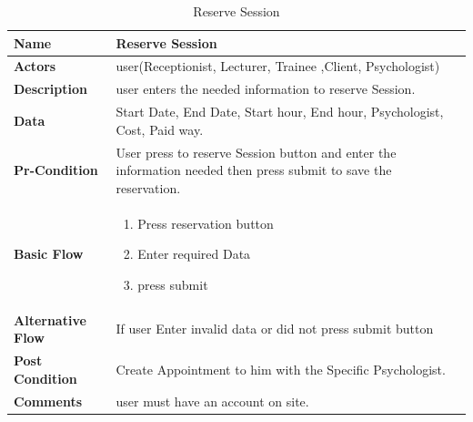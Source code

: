 \documentclass[../Psychological_system_web_application.tex]{subfiles}
\begin{document}
	\begin{center}
		\begin{table}[h!]
			\begin{tabular}{ | m{4cm} | m{10cm}| } 
				\hline
			 	\textbf{\large Name}& Reserve Session\\ 
				\hline
			  	\textbf{\large Actors}& user(Receptionist, Lecturer, Trainee ,Client, Psychologist)\\ 
				\hline
			  	\textbf{\large Description}& user enters the needed information to reserve Session.\\ 
				\hline
				\textbf{\large Data}& Start Date, End Date, Start hour, End hour, Psychologist, Cost, Paid way.\\ 
				\hline
				 \textbf{\large Pr-Condition}& User press to reserve Session button and enter the information needed then press submit to save the reservation. \\ 
				\hline
				\textbf{\large Basic Flow}&\begin{enumerate}
				\item
					Press reservation button 
				\item
					Enter required Data
				\item 
					press submit \end{enumerate}\\
					\hline
				\textbf{\large Alternative Flow}& If user Enter invalid data or did not press submit button\\ 
				\hline
				\textbf{\large Post Condition}& Create Appointment to him with the Specific Psychologist.\\ 
				\hline
				\textbf{\large Comments}& user must have an account on site.\\ 
				\hline
			\end{tabular}
			\caption{Reserve Session}
			\label{table:RESERVE-SESSION}
		\end{table}
	\end{center}
\end{document}
